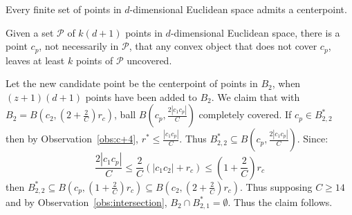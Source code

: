 \documentclass[envcountsame]{cls/cccg15}
\newcommand{\card}[1]{\left|{#1}\right|}
\newcommand{\lee}{\leqslant}
\newcommand{\gee}{\geqslant}
\renewcommand{\leq}{\lee}
\renewcommand{\le}{\lee}
\renewcommand{\ge}{\gee}
\begin{document}
\begin{prop}
Every finite set of points in $d$\nobreakdash-dimensional Euclidean space admits a centerpoint.\cite{edelsbrunner1987algorithms}
\end{prop}

\begin{cor}
\label{cor:omitting-centerpoint}
Given a set $\mathcal{P}$ of $k(d+1)$ points in $d$\nobreakdash-dimensional Euclidean space, there is a point $c_p$, not necessarily in $\mathcal{P}$, that any convex object that does not cover $c_p$, leaves at least $k$ points of $\mathcal{P}$ uncovered.
\end{cor}

Let the new candidate point be the centerpoint of points in $B_2$, when $(z+1)(d+1)$ points have been added to $B_2$. We claim that with $B_2 = B(c_2, (2 + \frac{2}{C})r_c)$, ball $B(c_p, \frac{2\card{c_1c_p}}{C})$ completely covered.
If $c_p \in B_{2,2}^*$ then by Observation~\ref{obs:c+4}, $r^* \le \frac{\card{c_1c_p}}{C}$. Thus $B_{2,2}^* \subseteq B(c_p, \frac{2\card{c_1c_p}}{C})$.
Since:
\[
\frac{2\card{c_1c_p}}{C} \leq \frac{2}{C}(\card{c_1c_2} + r_c) \leq (1 + \frac{2}{C})r_c
\]
 then $B_{2,2}^* \subseteq B(c_p, (1 + \frac{2}{C})r_c) \subseteq B(c_2, (2 + \frac{2}{C})r_c)$. Thus supposing $C \ge 14$ and by Observation~\ref{obs:intersection}, $B_2 \cap B_{2,1}^* = \emptyset$. Thus the claim follows.
\end{document}
